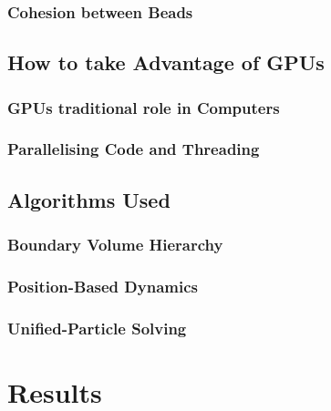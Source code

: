 \documentclass{book}
\begin{document}
\subsection{Cohesion between Beads}

\section{How to take Advantage of GPUs}
\subsection{GPUs traditional role in Computers}
\subsection{Parallelising Code and Threading}

\section{Algorithms Used}
\subsection{Boundary Volume Hierarchy}
\subsection{Position-Based Dynamics}
\subsection{Unified-Particle Solving}

\chapter{Results}
\end{document}
